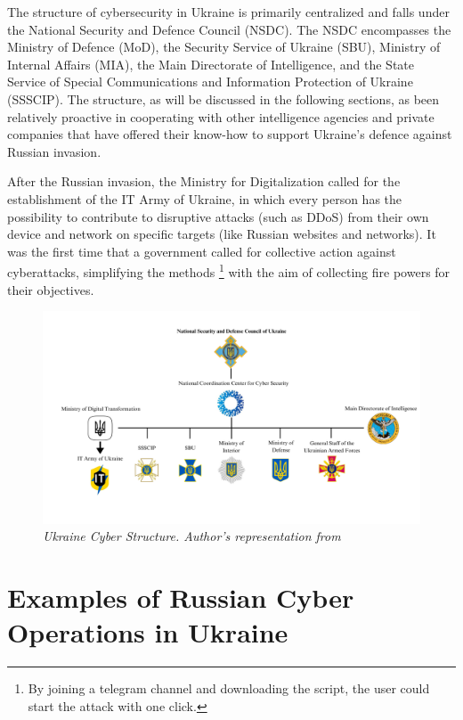 The structure of cybersecurity in Ukraine is primarily centralized and falls under the National Security and Defence Council (NSDC). The NSDC encompasses the Ministry of Defence (MoD), the Security Service of Ukraine (SBU), Ministry of Internal Affairs (MIA), the Main Directorate of Intelligence, and the State Service of Special Communications and Information Protection of Ukraine (SSSCIP). The structure, as will be discussed in the following sections, as been relatively proactive in cooperating with other intelligence agencies and private companies that have offered their know-how to support Ukraine's defence against Russian invasion. 

After the Russian invasion, the Ministry for Digitalization called for the establishment of the IT Army of Ukraine, in which every person has the possibility to contribute to disruptive attacks (such as DDoS) from their own device and network on specific targets (like Russian websites and networks). It was the first time that a government called for collective action against cyberattacks, simplifying the methods \footnote{By joining a telegram channel and downloading the script, the user could start the attack with one click.} with the aim of collecting fire powers for their objectives. 

\begin{figure}[H]
\centering
\includegraphics[width=1\textwidth]{Images/UkraineCyber.png}
\caption{\textit{Ukraine Cyber Structure. Author's representation from \textcite{brantly_2019_cybersecurity}}}
\label{UkraineCyber.png}
\end{figure}

\section{Examples of Russian Cyber Operations in Ukraine}

